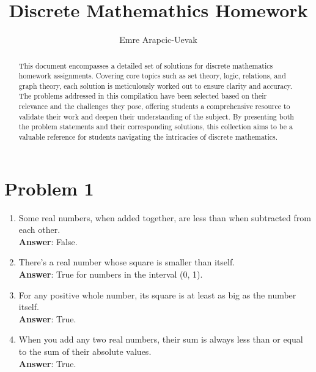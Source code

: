 \documentclass[a4paper, 10pt]{article}
\title{Discrete Mathemathics Homework}
\author{Emre Arapcic-Uevak}
\date{}
\begin{document}
	\maketitle
	\vspace{5mm}
	
	\begin{abstract}
		\begin{center}
			\noindent This document encompasses a detailed set of solutions for discrete mathematics homework assignments. Covering core topics such as set theory, logic, relations, and graph theory, each solution is meticulously worked out to ensure clarity and accuracy. The problems addressed in this compilation have been selected based on their relevance and the challenges they pose, offering students a comprehensive resource to validate their work and deepen their understanding of the subject. By presenting both the problem statements and their corresponding solutions, this collection aims to be a valuable reference for students navigating the intricacies of discrete mathematics.
		\end{center}
	\end{abstract}
	\pagebreak
	
	\tableofcontents
	\pagebreak

    \section{Problem 1}

    \begin{enumerate}
        \item Some real numbers, when added together, are less than when subtracted from each other. \\
        \textbf{Answer}: False.

        \item There's a real number whose square is smaller than itself. \\
        \textbf{Answer}: True for numbers in the interval (0, 1).

        \item For any positive whole number, its square is at least as big as the number itself. \\
        \textbf{Answer}: True.

        \item When you add any two real numbers, their sum is always less than or equal to the sum of their absolute values. \\
        \textbf{Answer}: True.
    \end{enumerate}
\end{document}
